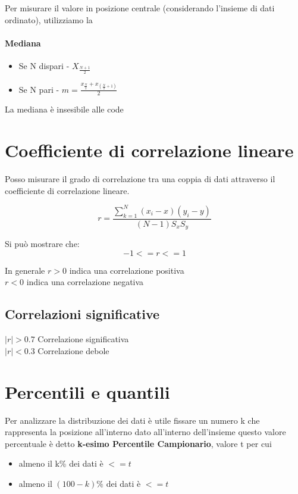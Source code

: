 \documentclass[12pt, a4paper, openany]{book}
\begin{document}
Per misurare il valore in posizione centrale (considerando l'insieme di dati ordinato), utilizziamo la
\paragraph{\textbf{Mediana}}
\begin{itemize}
    \item Se N dispari - {$X_\frac{N+1}{2}$}
    \item Se N pari - $m = \frac{x_\frac{N}{2}+x_(\frac{N}{2}+1)}{2}$
\end{itemize}

La mediana è insesibile alle code

\section{Coefficiente di correlazione lineare}
Posso misurare il grado di correlazione tra una coppia di dati attraverso il coefficiente di correlazione lineare. 

\begin{equation}
    r = \frac{\sum_{k=1}^N (x_i - x)(y_i - y)}{(N -1)S_x S_y}
\end{equation}

Si può mostrare che:
\begin{equation}
    -1<=r<=1
\end{equation}

In generale $r > 0$ indica una correlazione positiva
\\ $r < 0$ indica una correlazione negativa 

\subsection{Correlazioni significative}
$|r| > 0.7$ Correlazione significativa
\\$|r| < 0.3$ Correlazione debole

\section{Percentili e quantili}
Per analizzare la distribuzione dei dati è utile fissare un numero k che rappresenta la posizione all'interno dato all'interno dell'insieme
questo valore percentuale è detto \textbf{k-esimo Percentile Campionario}, valore t per cui
\begin{itemize}
    \item almeno il k\% dei dati è $ <= t$
    \item almeno il $(100 -k)\%$ dei dati è $<= t$
\end{itemize}
\end{document}
